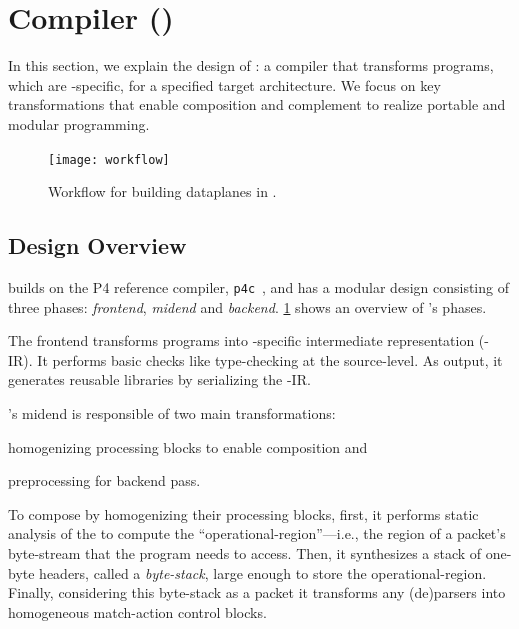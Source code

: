 \documentclass[letterpaper,twocolumn,10pt]{article}
\begin{document}
\section{\ulang Compiler (\ucomp)}
\label{sec:compiler}
In this section, we explain the design of \ucomp: a compiler that
transforms \ulang programs, which are \uarch-specific, for a specified
target architecture. We focus on key transformations that enable
composition and complement \uarch to realize portable and modular
programming.

\begin{figure}[tbh]
  \centering
  \texttt{[image: workflow]}
  \caption{Workflow for building dataplanes in \ulang. }
  \label{fig:workflow}
\end{figure}

\subsection{\ucomp Design Overview}
\label{sec:compiler-design}
\ucomp builds on the P4 reference compiler, \texttt{p4c}~\cite{p4c},
and has a modular design consisting of three phases: \emph{frontend},
\emph{midend} and \emph{backend}. \cref{fig:workflow} shows an
overview of \ucomp's phases.

%
The frontend transforms \ulang programs into \ucomp-specific
intermediate representation (\ucomp-IR). It performs basic checks like
type-checking at the source-level. As output, it generates reusable
libraries by serializing the \ucomp-IR.

%
\ucomp's midend is responsible of two main transformations:
\begin{enumerate*}[label=(\roman*)]
  \item homogenizing processing blocks to enable composition and
  \item preprocessing for backend pass.
\end{enumerate*}

To compose \uprograms by homogenizing their processing blocks, first,
it performs static analysis of the \uprogram to compute the
``operational-region''---i.e., the region of a packet's byte-stream
that the program needs to access. Then, it synthesizes a stack of
one-byte headers, called a \emph{byte-stack}, large enough to store
the operational-region. Finally, considering this byte-stack as a
packet it transforms any (de)parsers into homogeneous match-action
control blocks.
\end{document}
